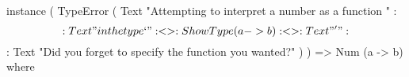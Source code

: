 \begin{code}
instance
    ( TypeError
        ( Text "Attempting to interpret a number as a function "
     :$$: Text "in the type `"
     :<>: ShowType (a -> b)
     :<>: Text "'"
     :$$: Text "Did you forget to specify the function you wanted?"
        )
    ) => Num (a -> b) where
\end{code}
